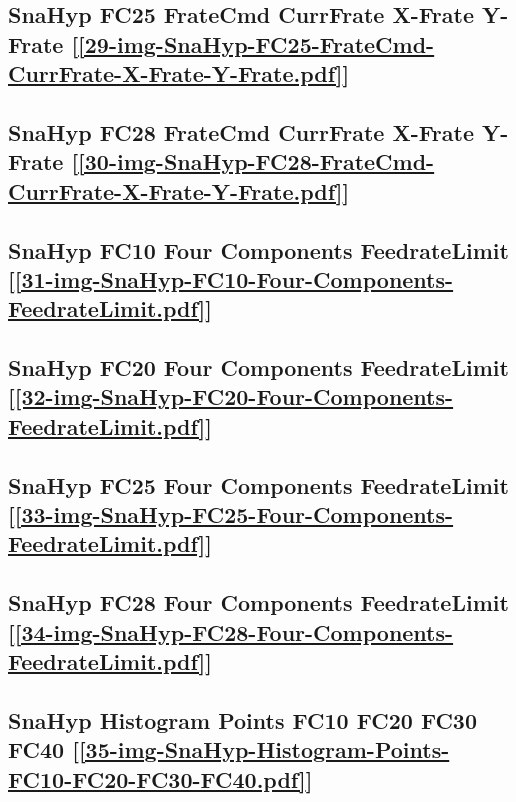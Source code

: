 \subsection       {SnaHyp FC25 FrateCmd CurrFrate X-Frate Y-Frate
	[\ref      {29-img-SnaHyp-FC25-FrateCmd-CurrFrate-X-Frate-Y-Frate.pdf}] }
\label{ssec-29-img-SnaHyp-FC25-FrateCmd-CurrFrate-X-Frate-Y-Frate.pdf}

\subsection       {SnaHyp FC28 FrateCmd CurrFrate X-Frate Y-Frate
	[\ref      {30-img-SnaHyp-FC28-FrateCmd-CurrFrate-X-Frate-Y-Frate.pdf}] }
\label{ssec-30-img-SnaHyp-FC28-FrateCmd-CurrFrate-X-Frate-Y-Frate.pdf}

\subsection       {SnaHyp FC10 Four Components FeedrateLimit
	[\ref      {31-img-SnaHyp-FC10-Four-Components-FeedrateLimit.pdf}] }
\label{ssec-31-img-SnaHyp-FC10-Four-Components-FeedrateLimit.pdf}

\subsection       {SnaHyp FC20 Four Components FeedrateLimit
	[\ref      {32-img-SnaHyp-FC20-Four-Components-FeedrateLimit.pdf}] }
\label{ssec-32-img-SnaHyp-FC20-Four-Components-FeedrateLimit.pdf}

\subsection       {SnaHyp FC25 Four Components FeedrateLimit
	[\ref      {33-img-SnaHyp-FC25-Four-Components-FeedrateLimit.pdf}] }
\label{ssec-33-img-SnaHyp-FC25-Four-Components-FeedrateLimit.pdf}

\subsection       {SnaHyp FC28 Four Components FeedrateLimit
	[\ref      {34-img-SnaHyp-FC28-Four-Components-FeedrateLimit.pdf}]}
\label{ssec-34-img-SnaHyp-FC28-Four-Components-FeedrateLimit.pdf}

\subsection       {SnaHyp Histogram Points FC10 FC20 FC30 FC40
	[\ref      {35-img-SnaHyp-Histogram-Points-FC10-FC20-FC30-FC40.pdf}] }
\label{ssec-35-img-SnaHyp-Histogram-Points-FC10-FC20-FC30-FC40.pdf}


